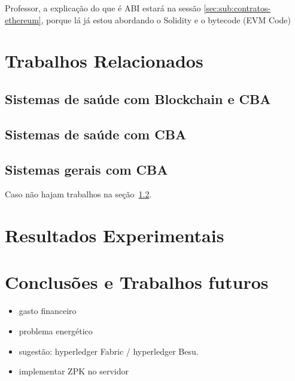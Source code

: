 \documentclass[a4paper,11pt]{article}
\begin{document}
{\color{RoyalBlue} Professor, a explicação do que é ABI estará na sessão \ref{sec:sub:contratos-ethereum}, porque lá já estou abordando o Solidity e o bytecode (EVM Code)}

\newpage
\section{Trabalhos Relacionados}

\subsection{Sistemas de saúde com Blockchain e CBA}

\subsection{Sistemas de saúde com CBA}
\label{sec:sub:saude-cba}

\subsection{Sistemas gerais com CBA}

Caso não hajam trabalhos na seção~\ref{sec:sub:saude-cba}.

\newpage
\section{Resultados Experimentais}



\newpage
\section{Conclusões e Trabalhos futuros}

\begin{itemize}
  \item gasto financeiro
  \item problema energético
  \item sugestão: hyperledger Fabric / hyperledger Besu.
  \item implementar ZPK no servidor
\end{itemize}



\end{document}
